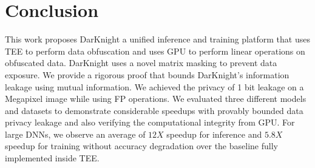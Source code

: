 \section{Conclusion}
\label{sec:con}
This work proposes DarKnight a unified inference and training platform that uses TEE to perform data obfuscation and uses GPU to perform linear operations on obfuscated data. DarKnight uses a novel matrix masking to prevent data exposure. We provide a rigorous proof that bounds DarKnight's information leakage using mutual information. We achieved the privacy of 1 bit leakage on a Megapixel image while using FP operations. 
We evaluated three different models and datasets to demonstrate considerable speedups with provably bounded data privacy leakage and also verifying the computational integrity from GPU. For large DNNs, we observe an average of $12X$ speedup for inference and $5.8X$ speedup for training without accuracy degradation over the baseline fully implemented inside TEE.
